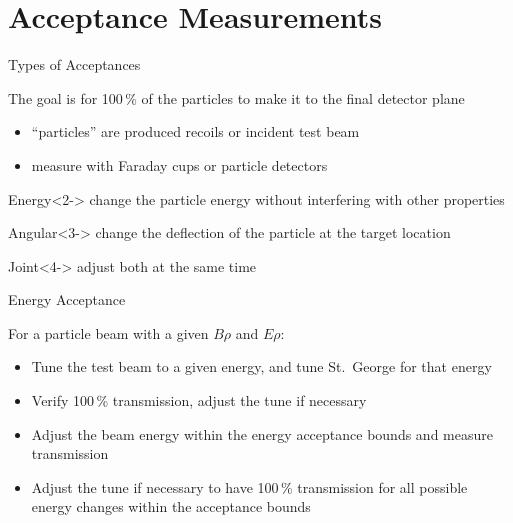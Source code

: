 \documentclass[10pt]{beamer}
\begin{document}
\section{Acceptance Measurements}

\begin{frame}[fragile]{Types of Acceptances}

    The goal is for 100\,\% of the particles to make it to the
    final detector plane
    \begin{itemize}
        \item ``particles'' are produced recoils or incident test beam
        \item measure with Faraday cups or particle detectors
    \end{itemize}


    \begin{alertblock}{Energy}<2->%
        change the particle energy without interfering with other
        properties
    \end{alertblock}
    \begin{alertblock}{Angular}<3->
        change the deflection of the particle at the target location
    \end{alertblock}
    \begin{alertblock}{Joint}<4->
        adjust both at the same time
    \end{alertblock}

\end{frame}

\begin{frame}[fragile]{Energy Acceptance}

    For a particle beam with a given $B\rho$ and $E\rho$:

    \begin{itemize}
        \item Tune the test beam to a given energy, and
            tune St.\ George for that energy
        \item Verify 100\,\% transmission, adjust the tune
            if necessary
        \item Adjust the beam energy within the energy
            acceptance bounds and measure transmission
        \item Adjust the tune if necessary to have 100\,\%
            transmission for all possible energy changes within the
            acceptance bounds
    \end{itemize}

\end{frame}
\end{document}
